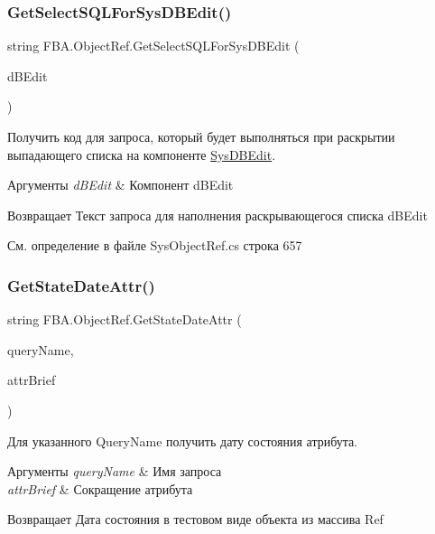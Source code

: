 \subsubsection{\texorpdfstring{Get\+Select\+S\+Q\+L\+For\+Sys\+D\+B\+Edit()}{GetSelectSQLForSysDBEdit()}}
{\footnotesize\ttfamily string F\+B\+A.\+Object\+Ref.\+Get\+Select\+S\+Q\+L\+For\+Sys\+D\+B\+Edit (\begin{DoxyParamCaption}\item[{\mbox{\hyperlink{class_f_b_a_1_1_sys_d_b_edit}{Sys\+D\+B\+Edit}}}]{d\+B\+Edit }\end{DoxyParamCaption})}



Получить код для запроса, который будет выполняться при раскрытии выпадающего списка на компоненте \mbox{\hyperlink{class_f_b_a_1_1_sys_d_b_edit}{Sys\+D\+B\+Edit}}. 


\begin{DoxyParams}{Аргументы}
{\em d\+B\+Edit} & Компонент d\+B\+Edit\\
\hline
\end{DoxyParams}
\begin{DoxyReturn}{Возвращает}
Текст запроса для наполнения раскрывающегося списка d\+B\+Edit
\end{DoxyReturn}


См. определение в файле Sys\+Object\+Ref.\+cs строка 657

\mbox{\label{class_f_b_a_1_1_object_ref_aa556797383dfa9978fb7cf040d2aad93}} 
\subsubsection{\texorpdfstring{Get\+State\+Date\+Attr()}{GetStateDateAttr()}}
{\footnotesize\ttfamily string F\+B\+A.\+Object\+Ref.\+Get\+State\+Date\+Attr (\begin{DoxyParamCaption}\item[{string}]{query\+Name,  }\item[{string}]{attr\+Brief }\end{DoxyParamCaption})}



Для указанного Query\+Name получить дату состояния атрибута. 


\begin{DoxyParams}{Аргументы}
{\em query\+Name} & Имя запроса\\
\hline
{\em attr\+Brief} & Сокращение атрибута\\
\hline
\end{DoxyParams}
\begin{DoxyReturn}{Возвращает}
Дата состояния в тестовом виде объекта из массива Ref
\end{DoxyReturn}


